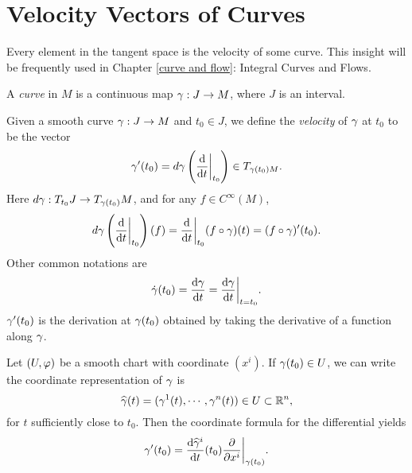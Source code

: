 \section{Velocity Vectors of Curves}
Every element in the tangent space is the velocity of some curve. This insight will be frequently used in Chapter \ref{curve and flow}: Integral Curves and Flows. 


\begin{definition}
    A \textit{curve} in $M$ is a continuous map $\gamma:J \to M$, where $J$ is an interval. 
\end{definition}
Given a smooth curve $\gamma: J \to M$ and $t_0 \in J$, we define the \textit{velocity} of $\gamma$ at $t_0$ to be the vector
$$\gamma'(t_0) = d\gamma \left(\dv{}{t}\bigg|_{t_0} \right) \in T_{\gamma(t_0)M }. $$
Here $d\gamma: T_{t_0}J \to T_{\gamma(t_0)}M$, and for any $f \in C^\infty(M)$, 
$$d\gamma \left(\dv{}{t}\bigg|_{t_0} \right)(f) = \dv{}{t}\bigg|_{t_0}(f \circ \gamma)(t) = (f \circ \gamma)'(t_0). $$
Other common notations are
$$\dot{\gamma}(t_0) = \dv{\gamma}{t}(t_0) = \dv{\gamma}{t}\bigg|_{t=t_0}. $$
$\gamma'(t_0)$ is the derivation at $\gamma(t_0)$ obtained by taking the derivative of a function along $\gamma$. 

Let $(U,\varphi)$ be a smooth chart with coordinate $(x^i)$. If $\gamma(t_0) \in U$, we can write the coordinate representation of $\gamma$ is 
$$ \widehat{\gamma}(t) = (\gamma^1(t), \cdots, \gamma^n(t)) \in U \subset \mathbb{R}^n, $$ 
for $t$ sufficiently close to $t_0$. Then the coordinate formula for the differential yields
$$ \gamma'(t_0) = {\dv{\widehat{\gamma}^i}{t}}(t_0) \pdv{}{x^i}\bigg|_{\gamma(t_0)}. $$

